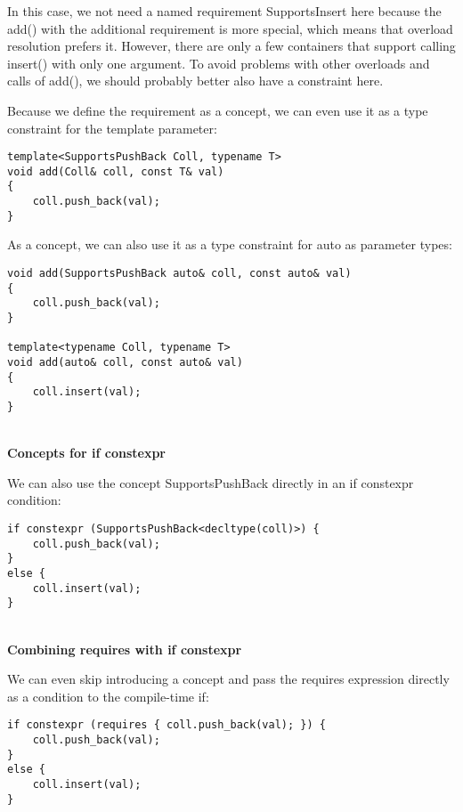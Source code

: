 In this case, we not need a named requirement SupportsInsert here because the add() with the additional requirement is more special, which means that overload resolution prefers it. However, there are only a few containers that support calling insert() with only one argument. To avoid problems with other overloads and calls of add(), we should probably better also have a constraint here.

Because we define the requirement as a concept, we can even use it as a type constraint for the template parameter:

\begin{lstlisting}[style=styleCXX]
template<SupportsPushBack Coll, typename T>
void add(Coll& coll, const T& val)
{
	coll.push_back(val);
}
\end{lstlisting}

As a concept, we can also use it as a type constraint for auto as parameter types:

\begin{lstlisting}[style=styleCXX]
void add(SupportsPushBack auto& coll, const auto& val)
{
	coll.push_back(val);
}

template<typename Coll, typename T>
void add(auto& coll, const auto& val)
{
	coll.insert(val);
}
\end{lstlisting}

\noindent
\hspace*{\fill} \\ %
\textbf{Concepts for if constexpr}

We can also use the concept SupportsPushBack directly in an if constexpr condition:

\begin{lstlisting}[style=styleCXX]
if constexpr (SupportsPushBack<decltype(coll)>) {
	coll.push_back(val);
}
else {
	coll.insert(val);
}
\end{lstlisting}

\noindent
\hspace*{\fill} \\ %
\textbf{Combining requires with if constexpr}

We can even skip introducing a concept and pass the requires expression directly as a condition to the compile-time if:

\begin{lstlisting}[style=styleCXX]
if constexpr (requires { coll.push_back(val); }) {
	coll.push_back(val);
}
else {
	coll.insert(val);
}
\end{lstlisting}

